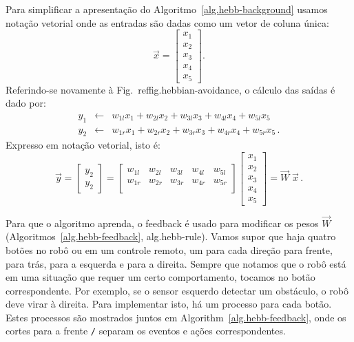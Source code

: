 Para simplificar a apresentação do Algoritmo~\ref{alg.hebb-background} usamos notação vetorial onde as entradas são dadas como um vetor de coluna única:
\[
\vec{x} = \left[ \begin{array}{c} x_1\\x_2\\x_3\\x_4\\x_5 \end{array} \right].
\]
Referindo-se novamente à Fig.~ref{fig.hebbian-avoidance}, o cálculo das saídas é dado por:
\begin{eqnarray}
y_1 & \leftarrow & w_{1l}x_1 + w_{2l}x_2 + w_{3l}x_3 + w_{4l}x_4 + w_{5l}x_5\label{eqn.yl}\\
y_2 & \leftarrow & w_{1r}x_1 + w_{2r}x_2 + w_{3r}x_3 + w_{4r}x_4 + w_{5r}x_5\label{eqn.yr}\,.
\end{eqnarray}
Expresso em notação vetorial, isto é:
\begin{equation}\label{eqn.hebbian}
\vec{y} =
\left[ \begin{array}{c} y_2\\y_2 \end{array} \right] =
\left[
  \begin{array}{ccccc}
    w_{1l} & w_{2l} & w_{3l} & w_{4l} & w_{5l} \\
    w_{1r} & w_{2r} & w_{3r} & w_{4r} & w_{5r} \\
\end{array}
\right]
\left[ \begin{array}{c} x_1\\x_2\\x_3\\x_4\\x_5 \end{array} \right] =
\vec{W}\;\vec{x}\,.
\end{equation}

Para que o algoritmo aprenda, o feedback é usado para modificar os pesos $\vec{W}$ (Algoritmos~\ref{alg.hebb-feedback}, {alg.hebb-rule}). Vamos supor que haja quatro botões no robô ou em um controle remoto, um para cada direção para frente, para trás, para a esquerda e para a direita. Sempre que notamos que o robô está em uma situação que requer um certo comportamento, tocamos no botão correspondente. Por exemplo, se o sensor esquerdo detectar um obstáculo, o robô deve virar à direita. Para implementar isto, há um processo para cada botão. Estes processos são mostrados juntos em Algorithm~\ref{alg.hebb-feedback}, onde os cortes para a frente \verb+/+ separam os eventos e ações correspondentes.

